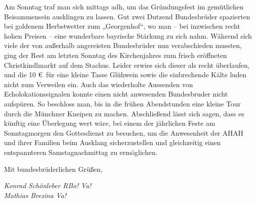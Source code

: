 \begin{multicols}{2}
Am Sonntag traf man sich mittags adh, um das Gründungsfest im gemütlichen Beisammensein ausklingen zu lassen. Gut zwei Dutzend Bundesbrüder spazierten bei goldenem Herbstwetter zum „Georgenhof“, wo man – bei inzwischen recht hohen Preisen – eine wunderbare bayrische Stärkung zu sich nahm. Während sich viele der von außerhalb angereisten Bundesbrüder nun verabschieden mussten, ging der Rest am letzten Sonntag des Kirchenjahres zum frisch eröffneten Christkindlmarkt auf dem Stachus. Leider erwies sich dieser als recht überlaufen, und die 10 \euro ~für eine kleine Tasse Glühwein sowie die einbrechende Kälte luden nicht zum Verweilen ein. Auch das wiederholte Aussenden von Echolokationssignalen konnte einen nicht anwesenden Bundesbruder nicht aufspüren. So beschloss man, bis in die frühen Abendstunden eine kleine Tour durch die Münchner Kneipen zu machen. Abschließend lässt sich sagen, dass es künftig eine Überlegung wert wäre, bei einem der jährlichen Feste am Sonntagmorgen den Gottesdienst zu besuchen, um die Anwesenheit der AHAH und ihrer Familien beim Ausklang sicherzustellen und gleichzeitig einen entspannteren Samstagnachmittag zu ermöglichen.

Mit bundesbrüderlichen Grüßen,

	\begin{flushright}
		\hfill\emph{Konrad Schönleber RBo! Va!\\
Mathias Brezina Va!}
	\end{flushright}
\end{multicols}


%
